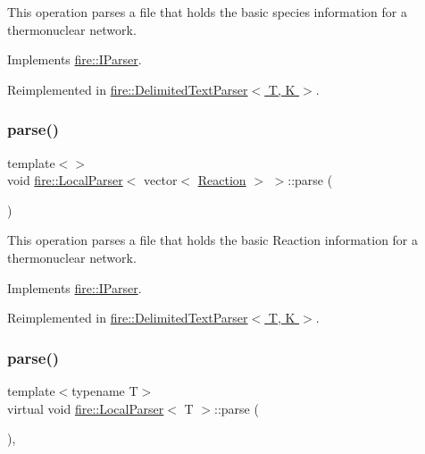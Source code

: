 This operation parses a file that holds the basic species information for a thermonuclear network. 

Implements \hyperlink{a00808_af36ac6eedd8c27d2f418869193d7d03c}{fire\+::\+I\+Parser}.



Reimplemented in \hyperlink{a00796_a773fa7ed28cb9d8c384ad94bd81fc93f}{fire\+::\+Delimited\+Text\+Parser$<$ T, K $>$}.

\mbox{\label{a00816_a34fd9ffb0196c612c75b5288ed5e219b}} 
\subsubsection{\texorpdfstring{parse()}{parse()}\hspace{0.1cm}{\footnotesize\ttfamily [2/3]}}
{\footnotesize\ttfamily template$<$$>$ \\
void \hyperlink{a00816}{fire\+::\+Local\+Parser}$<$ vector$<$ \hyperlink{a00752}{Reaction} $>$ $>$\+::parse (\begin{DoxyParamCaption}{ }\end{DoxyParamCaption})\hspace{0.3cm}{\ttfamily [virtual]}}

This operation parses a file that holds the basic Reaction information for a thermonuclear network. 

Implements \hyperlink{a00808_af36ac6eedd8c27d2f418869193d7d03c}{fire\+::\+I\+Parser}.



Reimplemented in \hyperlink{a00796_a773fa7ed28cb9d8c384ad94bd81fc93f}{fire\+::\+Delimited\+Text\+Parser$<$ T, K $>$}.

\mbox{\label{a00816_abd8929aea06c2dda40256d2e58236650}} 
\subsubsection{\texorpdfstring{parse()}{parse()}\hspace{0.1cm}{\footnotesize\ttfamily [3/3]}}
{\footnotesize\ttfamily template$<$typename T$>$ \\
virtual void \hyperlink{a00816}{fire\+::\+Local\+Parser}$<$ T $>$\+::parse (\begin{DoxyParamCaption}{ }\end{DoxyParamCaption})\hspace{0.3cm}{\ttfamily [inline]}, {\ttfamily [virtual]}}

